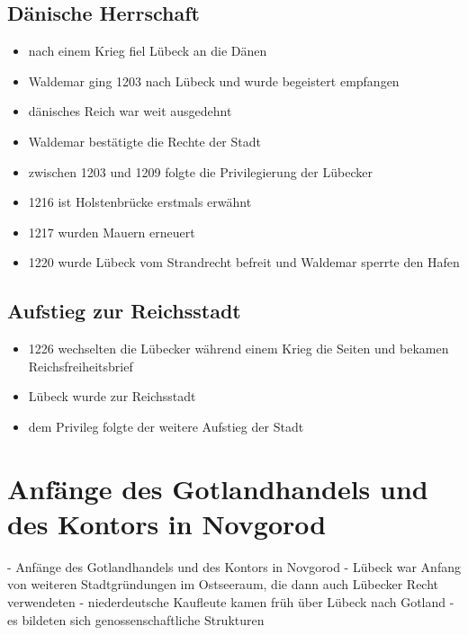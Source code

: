 \documentclass[10pt,a4paper,oneside,ngerman,numbers=noenddot]{scrartcl}
\newenvironment{myitemize}{\begin{itemize}\itemsep -2pt}{\end{itemize}} %
\begin{document}
\subsection*{Dänische Herrschaft}

\begin{myitemize}
    \item nach einem Krieg fiel Lübeck an die Dänen
    \item Waldemar ging 1203 nach Lübeck und wurde begeistert empfangen
    \item dänisches Reich war weit ausgedehnt
    \item Waldemar bestätigte die Rechte der Stadt
    \item zwischen 1203 und 1209 folgte die Privilegierung der Lübecker
    \item 1216 ist Holstenbrücke erstmals erwähnt
    \item 1217 wurden Mauern erneuert
    \item 1220 wurde Lübeck vom Strandrecht befreit und Waldemar sperrte den Hafen
\end{myitemize}

\subsection*{Aufstieg zur Reichsstadt}
\begin{myitemize}
    \item 1226 wechselten die Lübecker während einem Krieg die Seiten und bekamen Reichsfreiheitsbrief
    \item Lübeck wurde zur Reichsstadt
    \item dem Privileg folgte der weitere Aufstieg der Stadt
\end{myitemize}

\section*{Anfänge des Gotlandhandels und des Kontors in Novgorod}

- Anfänge des Gotlandhandels und des Kontors in Novgorod
- Lübeck war Anfang von weiteren Stadtgründungen im Ostseeraum, die dann auch Lübecker Recht verwendeten
- niederdeutsche Kaufleute kamen früh über Lübeck nach Gotland
- es bildeten sich genossenschaftliche Strukturen
\end{document}

